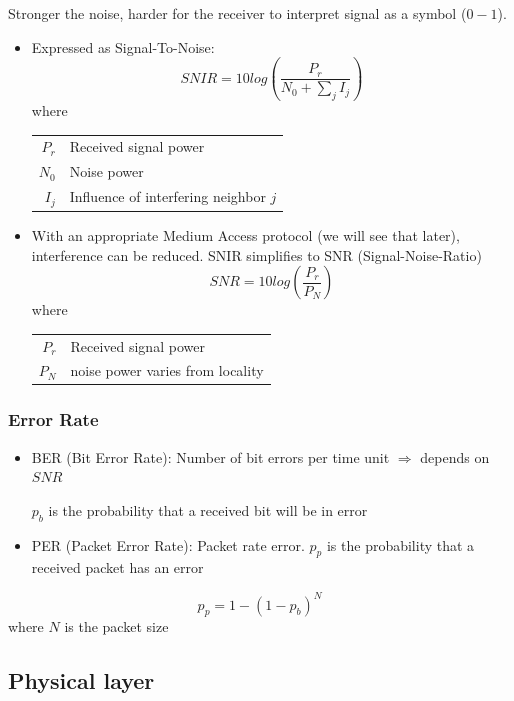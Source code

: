 \begin{itemize}
        Stronger the noise, harder for the receiver to interpret signal
        as a symbol ($0-1$).
        \begin{itemize}
            \item Expressed as Signal-To-Noise: $$SNIR = 10 log(\frac{P_r}{N_0 + \sum_j I_j})$$ 
                where \begin{tabular}{rl} $P_r$ & Received signal power \\
                $N_0$ & Noise power \\
                $I_j$ & Influence of interfering neighbor $j$
            \end{tabular}

        \item With an appropriate Medium Access protocol (we will see
            that later), interference can be reduced. SNIR simplifies to
            SNR (Signal-Noise-Ratio)
            $$SNR=10 log(\frac{P_r}{P_N})$$
            where \begin{tabular}{rl} $P_r$ & Received signal power \\
            $P_N$ & noise power varies from locality\\
        \end{tabular}
\end{itemize}
\end{itemize}

\subsubsection{Error Rate} 
\begin{itemize}
    \item BER (Bit Error Rate): Number of bit errors per time unit
        $\Rightarrow$ depends on $SNR$

        $p_b$ is the probability that a received bit will be in error
    \item PER (Packet Error Rate): Packet rate error.
        $p_p$ is the probability that a received packet has an error
\end{itemize}

$$p_p = 1 - (1 - p_b)^N$$ where $N$ is the packet size


\subsection{Physical layer}

